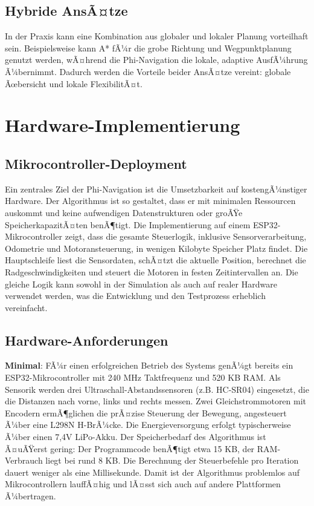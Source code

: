 ﻿\documentclass[a4paper,12pt]{article}
\theoremstyle{definition}
\begin{document}
\subsection{Hybride AnsÃ¤tze}

In der Praxis kann eine Kombination aus globaler und lokaler Planung vorteilhaft sein. Beispielsweise kann A* fÃ¼r die grobe Richtung und Wegpunktplanung genutzt werden, wÃ¤hrend die Phi-Navigation die lokale, adaptive AusfÃ¼hrung Ã¼bernimmt. Dadurch werden die Vorteile beider AnsÃ¤tze vereint: globale Ãœbersicht und lokale FlexibilitÃ¤t.

\section{Hardware-Implementierung}

\subsection{Mikrocontroller-Deployment}

Ein zentrales Ziel der Phi-Navigation ist die Umsetzbarkeit auf kostengÃ¼nstiger Hardware. Der Algorithmus ist so gestaltet, dass er mit minimalen Ressourcen auskommt und keine aufwendigen Datenstrukturen oder groÃŸe SpeicherkapazitÃ¤ten benÃ¶tigt. Die Implementierung auf einem ESP32-Mikrocontroller zeigt, dass die gesamte Steuerlogik, inklusive Sensorverarbeitung, Odometrie und Motoransteuerung, in wenigen Kilobyte Speicher Platz findet. Die Hauptschleife liest die Sensordaten, schÃ¤tzt die aktuelle Position, berechnet die Radgeschwindigkeiten und steuert die Motoren in festen Zeitintervallen an. Die gleiche Logik kann sowohl in der Simulation als auch auf realer Hardware verwendet werden, was die Entwicklung und den Testprozess erheblich vereinfacht.

\subsection{Hardware-Anforderungen}

	\textbf{Minimal}:
FÃ¼r einen erfolgreichen Betrieb des Systems genÃ¼gt bereits ein ESP32-Mikrocontroller mit 240 MHz Taktfrequenz und 520 KB RAM. Als Sensorik werden drei Ultraschall-Abstandssensoren (z.B. HC-SR04) eingesetzt, die die Distanzen nach vorne, links und rechts messen. Zwei Gleichstrommotoren mit Encodern ermÃ¶glichen die prÃ¤zise Steuerung der Bewegung, angesteuert Ã¼ber eine L298N H-BrÃ¼cke. Die Energieversorgung erfolgt typischerweise Ã¼ber einen 7,4V LiPo-Akku. Der Speicherbedarf des Algorithmus ist Ã¤uÃŸerst gering: Der Programmcode benÃ¶tigt etwa 15 KB, der RAM-Verbrauch liegt bei rund 8 KB. Die Berechnung der Steuerbefehle pro Iteration dauert weniger als eine Millisekunde. Damit ist der Algorithmus problemlos auf Mikrocontrollern lauffÃ¤hig und lÃ¤sst sich auch auf andere Plattformen Ã¼bertragen.
\end{document}
